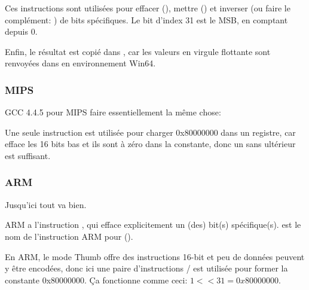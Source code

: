 Ces instructions sont utilisées pour effacer (\BTR), mettre (\BTS) et inverser (ou
faire le complément: \BTC) de bits spécifiques.
Le bit d'index 31 est le \ac{MSB}, en comptant depuis 0.

Enfin, le résultat est copié dans , car les valeurs en virgule flottante
sont renvoyées dans  en environnement Win64.

\subsubsection{MIPS}

GCC 4.4.5 pour MIPS faire essentiellement la même chose:




Une seule instruction \LUI est utilisée pour charger 0x80000000 dans un registre,
car \LUI efface les 16 bits bas et ils sont à zéro dans la constante, donc un \LUI
sans \ORI ultérieur est suffisant.

\subsubsection{ARM}

\myparagraph{\OptimizingKeilVI (\ARMMode)}



Jusqu'ici tout va bien.

ARM a l'instruction \BIC, qui efface explicitement un (des) bit(s) spécifique(s).
\EOR est le nom de l'instruction ARM pour \XOR ().

\myparagraph{\OptimizingKeilVI (\ThumbMode)}



En ARM, le mode Thumb offre des instructions 16-bit et peu de données peuvent y être
encodées, donc ici une paire d'instructions / est utilisée pour
former la constante 0x80000000.
Ça fonctionne comme ceci: $1<<31 = 0x80000000$.


